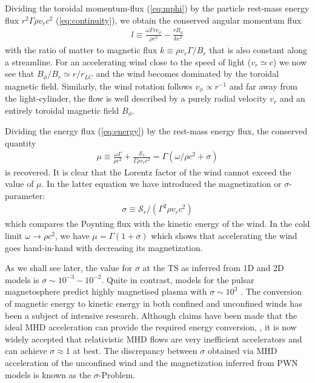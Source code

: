 Dividing the toroidal momentum-flux (\ref{eq:mphi}) by the particle rest-mass energy flux $r^2\Gamma \rho v_r c^2$ (\ref{eq:continuity}), we obtain the conserved angular momentum flux
%
\begin{align}
  l \equiv \frac{\omega\Gamma r v_\phi}{\rho c^2}-\frac{r B_\phi}{k c^2}
\end{align}
with the ratio of matter to magnetic flux $k\equiv\rho v_r \Gamma / B_r$ that is also constant along a streamline.  For an accelerating wind close to the speed of light ($v_r\simeq c$) we now see that $B_\phi/B_r\simeq r/r_{LC}$ and the wind becomes dominated by the toroidal magnetic field.  Similarly, the wind rotation follows $v_\phi\propto r^{-1}$ and far away from the light-cylinder, the flow is well described by a purely radial velocity $v_r$ and an entirely toroidal magnetic field $B_\phi$.

Dividing the energy flux (\ref{eq:energy}) by the rest-mass energy flux, the conserved quantity
\begin{align}
  \mu \equiv \frac{\omega \Gamma}{\rho c^2} + \frac{\mathcal{S}_r}{\Gamma \rho v_r c^2} = \Gamma (\omega/\rho c^2 + \sigma)
\end{align}
is recovered.  It is clear that the Lorentz factor of the wind cannot exceed the value of $\mu$.  In the latter equation we have introduced the magnetization or $\sigma$-parameter:
\begin{align}
  \sigma\equiv \mathcal{S}_r/(\Gamma^2\rho v_r c^2)
\end{align}
which compares the Poynting flux with the kinetic energy of the wind.  In the cold limit $\omega\to \rho c^2$, we have $\mu=\Gamma(1+\sigma)$ which shows that accelerating the wind goes hand-in-hand with decreasing its magnetization.

As we shall see later, the value for $\sigma$ at the TS as inferred from 1D and 2D models is $\sigma\sim10^{-3}-10^{-2}$.  Quite in contrast, models for the pulsar magnetosphere predict highly magnetised plasma with $\sigma\sim10^3$ \citep[e.g.][and references therein]{arons2012}.  
The conversion of magnetic energy to kinetic energy in both confined and unconfined winds has been a subject of intensive research.  
Although claims have been made that the ideal MHD acceleration can provide the required energy conversion, \cite[e.g.][]{vlahakis2004}, it is now widely accepted that relativistic MHD flows are very inefficient accelerators \citep[e.g.][]{2009MNRAS.394.1182K,2009ApJ...699.1789T,lyubarsky2009,Lyubarsky2010} and can achieve $\sigma\approx1$ at best.  
The discrepancy between $\sigma$ obtained via MHD acceleration of the unconfined wind and the magnetization inferred from PWN models is known as the $\sigma$-Problem.  

